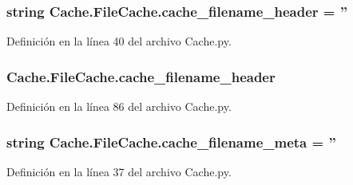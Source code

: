 \hypertarget{class_cache_1_1_file_cache_a27cec37d2b4d4aac26eb0999e220031e}{
\subsubsection[{cache\-\_\-filename\-\_\-header}]{\setlength{\rightskip}{0pt plus 5cm}string Cache.\-File\-Cache.\-cache\-\_\-filename\-\_\-header = ''\hspace{0.3cm}{\ttfamily [static]}}}\label{class_cache_1_1_file_cache_a27cec37d2b4d4aac26eb0999e220031e}


Definición en la línea 40 del archivo Cache.\-py.

\hypertarget{class_cache_1_1_file_cache_a4a427efcf91e7550463882b99d6b3df2}{
\subsubsection[{cache\-\_\-filename\-\_\-header}]{\setlength{\rightskip}{0pt plus 5cm}Cache.\-File\-Cache.\-cache\-\_\-filename\-\_\-header}}\label{class_cache_1_1_file_cache_a4a427efcf91e7550463882b99d6b3df2}


Definición en la línea 86 del archivo Cache.\-py.

\hypertarget{class_cache_1_1_file_cache_ab6e30d3196eea1c3cae1186945c8e0e2}{
\subsubsection[{cache\-\_\-filename\-\_\-meta}]{\setlength{\rightskip}{0pt plus 5cm}string Cache.\-File\-Cache.\-cache\-\_\-filename\-\_\-meta = ''\hspace{0.3cm}{\ttfamily [static]}}}\label{class_cache_1_1_file_cache_ab6e30d3196eea1c3cae1186945c8e0e2}


Definición en la línea 37 del archivo Cache.\-py.

